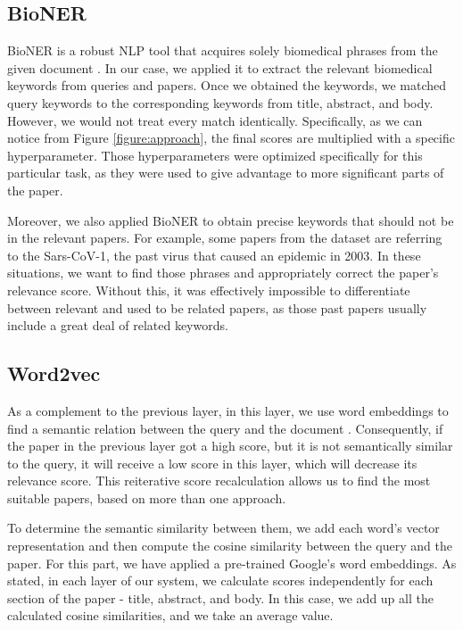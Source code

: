 \documentclass[10pt, a4paper]{article}
\begin{document}
	\subsection{BioNER}
	
	BioNER is a robust NLP tool that acquires solely biomedical phrases from the given document \citep{wang2019cross}.  In our case, we applied it to extract the relevant biomedical keywords from queries and papers.  Once we obtained the keywords, we matched query keywords to the corresponding keywords from title, abstract, and body. However, we would not treat every match identically. Specifically, as we can notice from Figure \ref{figure:approach}, the final scores are multiplied with a specific hyperparameter.  Those hyperparameters were optimized specifically for this particular task, as they were used to give advantage to more significant parts of the paper.
	
	Moreover, we also applied BioNER to obtain precise keywords that should not be in the relevant papers. For example, some papers from the dataset are referring to the Sars-CoV-1, the past virus that caused an epidemic in 2003. In these situations, we want to find those phrases and appropriately correct the paper's relevance score. Without this, it was effectively impossible to differentiate between relevant and used to be related papers, as those past papers usually include a great deal of related keywords.
	
	\subsection{Word2vec}
	
	As a complement to the previous layer, in this layer, we use word embeddings to find a semantic relation between the query and the document \cite{mikolov2013distributed}. Consequently, if the paper in the previous layer got a high score, but it is not semantically similar to the query, it will receive a low score in this layer, which will decrease its relevance score. This reiterative score recalculation allows us to find the most suitable papers, based on more than one approach.
	
	To determine the semantic similarity between them, we add each word's vector representation and then compute the cosine similarity between the query and the paper. For this part, we have applied a pre-trained Google's word embeddings. As stated, in each layer of our system, we calculate scores independently for each section of the paper - title, abstract, and body. In this case, we add up all the calculated cosine similarities, and we take an average value. 
	
\end{document}
